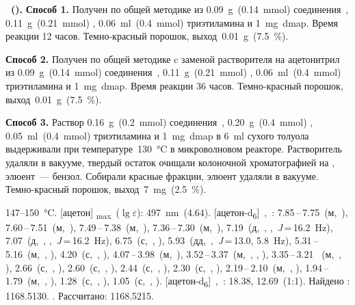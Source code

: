 \textbf{~().} 
\textbf{Способ 1.}
Получен по общей методике из \SI{0.09}{\gram}~(\SI{0.14}{\milli\mole}) соединения~, \SI{0.11}{\gram}~(\SI{0.21}{\milli\mole}) , \SI{0.06}{\milli\litre}~(\SI{0.4}{\milli\mole}) триэтиламина и \SI{1}{\milli\gram}~\ac{dmap}.
Время реакции 12 часов.
Темно-красный порошок, выход~\SI{0.01}{\gram}~(\SI{7.5}{\percent}).

\textbf{Способ 2.}
Получен по общей методике c заменой растворителя на ацетонитрил из \SI{0.09}{\gram}~(\SI{0.14}{\milli\mole}) соединения~, \SI{0.11}{\gram}~(\SI{0.21}{\milli\mole}) , \SI{0.06}{\milli\litre}~(\SI{0.4}{\milli\mole}) триэтиламина и \SI{1}{\milli\gram}~\ac{dmap}.
Время реакции 36 часов.
Темно-красный порошок, выход~\SI{0.01}{\gram}~(\SI{7.5}{\percent}).

\textbf{Способ 3.}
Раствор \SI{0.16}{\gram}~(\SI{0.2}{\milli\mole}) соединения~, \SI{0.20}{\gram}~(\SI{0.4}{\milli\mole}) , \SI{0.05}{\milli\litre}~(\SI{0.4}{\milli\mole}) триэтиламина и \SI{1}{\milli\gram}~\ac{dmap} в \SI{6}{\ml} сухого толуола выдерживали при температуре~\SI{130}{\celsius} в микроволновом реакторе.
Растворитель удаляли в вакууме, твердый остаток очищали колоночной хроматографией на , элюент~--- бензол.
Собирали красные фракции, элюент удаляли в вакууме.
Темно-красный порошок, выход~\SI{7}{\milli\gram}~(\SI{2.5}{\percent}).
\begin{experimental}
     147--\SI{150}{\celsius}.
    [ацетон] \chemlambda\textsubscript{max}~($\lg \varepsilon$): \SI{497}{\nano\metre}~(4.64).
    [ацетон-d\textsubscript{6}]~\chemdelta,~\si{\ppm}: 7.85\,--\,7.75~(м,~), 7.60\,--\,7.51~(м,~), 7.49\,--\,7.38~(м,~), 7.36\,--\,7.30~(м,~), 7.19~(д,~, ,~\textit{J}\,=\,16.2~\si{\hertz}), 7.07~(д,~, ,~\textit{J}\,=\,16.2~\si{\hertz}), 6.75~(с,~, ), 5.93~(дд,~,~\textit{J}\,=\,13.0, 5.8~\si{\hertz}), 5.31\,--\,5.16~(м,~, ), 4.20~(с,~, ), 4.07\,--\,3.98~(м,~), 3.52\,--\,3.37~(м,~, , ), 3.35\,--\,3.21 ~(м,~, ), 2.66~(с,~, ), 2.60~(с,~, ), 2.44~(с,~, ), 2.30~(с,~, ), 2.19\,--\,2.10~(м,~, ), 1.94\,--\,1.79~(м,~, ), 1.28~(с,~, ), 1.05~(с,~, ).
    [ацетон-d\textsubscript{6}]~\chemdelta,~\si{\ppm}: 18.38, 12.69~(1:1).
     Найдено \ce{[M + H]+}: \num{1168.5130}. . Рассчитано: \ce{[M + H]} \num{1168.5215}.
\end{experimental}
